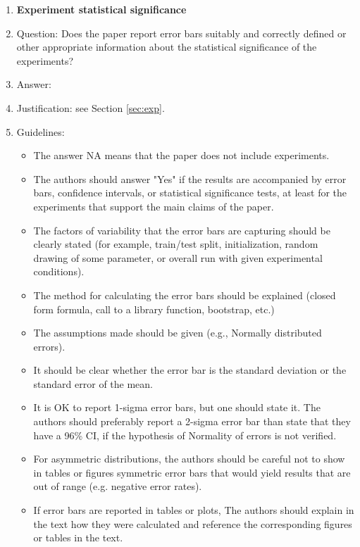 \documentclass{article}
\theoremstyle{plain}
\theoremstyle{definition}
\theoremstyle{remark}
\begin{document}
\begin{enumerate}
\item {\bf Experiment statistical significance}
    \item[] Question: Does the paper report error bars suitably and correctly defined or other appropriate information about the statistical significance of the experiments?
    \item[] Answer: \answerYes{} %
    \item[] Justification: see Section \ref{sec:exp}. 
    \item[] Guidelines:
    \begin{itemize}
        \item The answer NA means that the paper does not include experiments.
        \item The authors should answer "Yes" if the results are accompanied by error bars, confidence intervals, or statistical significance tests, at least for the experiments that support the main claims of the paper.
        \item The factors of variability that the error bars are capturing should be clearly stated (for example, train/test split, initialization, random drawing of some parameter, or overall run with given experimental conditions).
        \item The method for calculating the error bars should be explained (closed form formula, call to a library function, bootstrap, etc.)
        \item The assumptions made should be given (e.g., Normally distributed errors).
        \item It should be clear whether the error bar is the standard deviation or the standard error of the mean.
        \item It is OK to report 1-sigma error bars, but one should state it. The authors should preferably report a 2-sigma error bar than state that they have a 96\% CI, if the hypothesis of Normality of errors is not verified.
        \item For asymmetric distributions, the authors should be careful not to show in tables or figures symmetric error bars that would yield results that are out of range (e.g. negative error rates).
        \item If error bars are reported in tables or plots, The authors should explain in the text how they were calculated and reference the corresponding figures or tables in the text.
    \end{itemize}


\end{enumerate}
\end{document}
